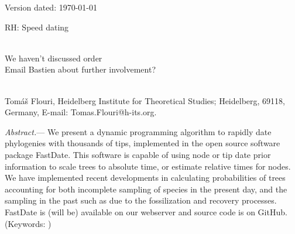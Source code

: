 \documentclass{llncs}
\newcommand{\ejmcomment}[1]{{\color{green} #1}}
\renewcommand{\subsubsection}[1]{%
\vspace{2ex}
\noindent
\textit{#1.}---}
\begin{document}
\begin{flushright}
Version dated: \today
\end{flushright}
\bigskip
\noindent RH: Speed dating


\bigskip
\medskip
\begin{center}

\bigskip




\\
\ejmcomment{We haven't discussed order\\ Email Bastien about further involvement?\\}
\\
\end{center}
\medskip
{} Tom\'{a}\v{s} Flouri, 
Heidelberg Institute for Theoretical Studies; Heidelberg, 69118, Germany, E-mail: Tomas.Flouri@h-its.org.\\


\vspace{1in}

\subsubsection{Abstract} We present a dynamic programming algorithm to rapidly
date phylogenies with thousands of tips, implemented in the open source software package FastDate. 
This software is capable of using node or tip date prior information to scale trees to absolute time,
or estimate relative times for nodes.
We have implemented recent developments in calculating probabilities of trees accounting for both incomplete 
sampling of species in the present day, and the sampling in the past 
such as due to the fossilization and recovery processes.
FastDate is \ejmcomment{(will be)} available on our webserver and source code is on GitHub.\\
\noindent (Keywords: )\\
\end{document}
